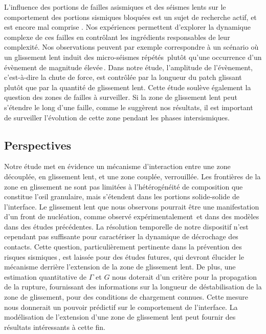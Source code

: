 L'influence des portions de failles asismiques et des séismes lents sur le comportement des portions sismiques bloquées est un sujet de recherche actif, et est encore mal comprise \cite{bedford_fault_2022, lindsey_slip_2021, tan_connecting_2020, leeman_frictional_2018, burgmann_geophysics_2018, radiguet_triggering_2016}. Nos expériences permettent d'explorer la dynamique complexe de ces failles en contrôlant les ingrédients responsables de leur complexité. Nos observations peuvent par exemple correspondre à un scénario où un glissement lent induit des micro-séismes répétés\,\cite{tan_connecting_2020} plutôt qu'une occurrence d'un évènement de magnitude élevée\,\cite{ong_factors_2021, kircher_when_2006}. Dans notre étude, l'amplitude de l'évènement, c'est-à-dire la chute de force, est contrôlée par la longueur du patch glissant plutôt que par la quantité de glissement lent. Cette étude soulève également la question des zones de failles à surveiller. Si la zone de glissement lent peut s'étendre le long d'une faille, comme le suggèrent nos résultats, il est important de surveiller l'évolution de cette zone pendant les phases intersismiques.



\subsection{Perspectives}


Notre étude met en évidence un mécanisme d'interaction entre une zone découplée, en glissement lent, et une zone couplée, verrouillée. Les frontières de la zone en glissement ne sont pas limitées à l'hétérogénéité de composition que constitue l'œil granulaire, mais s'étendent dans les portions solide-solide de l'interface. Le glissement lent que nous observons pourrait être une manifestation d'un front de nucléation, comme observé expérimentalement\,\cite{cebry_creep_2022,gvirtzman_nucleation_2021,latour_characterization_2013} et dans des modèles\,\cite{brener_unstable_2018,de_geus_how_2019} dans des études précédentes. La résolution temporelle de notre dispositif n'est cependant pas suffisante pour caractériser la dynamique de décrochage des contacts. Cette question, particulièrement pertinente dans la prévention des risques sismiques\,\cite{rolandone_seismic_2022,lindsey_slip_2021}, est laissée pour des études futures, qui devront élucider le mécanisme derrière l'extension de la zone de glissement lent. De plus, une estimation quantitative de $\Gamma$ et $G$ nous doterait d'un critère pour la propagation de la rupture, fournissant des informations sur la longueur de déstabilisation de la zone de glissement, pour des conditions de chargement connues. Cette mesure nous donnerait un pouvoir prédictif sur le comportement de l'interface. La modélisation de l'extension d'une zone de glissement lent peut fournir des résultats intéressants à cette fin.



